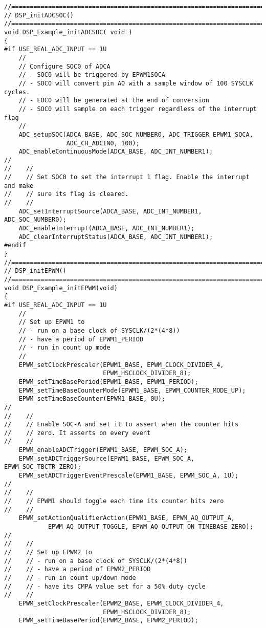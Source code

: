 \begin{lstlisting}[caption=\raggedright{mcu-libs/RLS.h}, frame=single]
//=============================================================================
// DSP_initADCSOC()
//=============================================================================
void DSP_Example_initADCSOC( void )
{
#if USE_REAL_ADC_INPUT == 1U
    //
    // Configure SOC0 of ADCA
    // - SOC0 will be triggered by EPWM1SOCA
    // - SOC0 will convert pin A0 with a sample window of 100 SYSCLK cycles.
    // - EOC0 will be generated at the end of conversion
    // - SOC0 will sample on each trigger regardless of the interrupt flag
    //
    ADC_setupSOC(ADCA_BASE, ADC_SOC_NUMBER0, ADC_TRIGGER_EPWM1_SOCA,
                 ADC_CH_ADCIN0, 100);
    ADC_enableContinuousMode(ADCA_BASE, ADC_INT_NUMBER1);
//
//    //
//    // Set SOC0 to set the interrupt 1 flag. Enable the interrupt and make
//    // sure its flag is cleared.
//    //
    ADC_setInterruptSource(ADCA_BASE, ADC_INT_NUMBER1, ADC_SOC_NUMBER0);
    ADC_enableInterrupt(ADCA_BASE, ADC_INT_NUMBER1);
    ADC_clearInterruptStatus(ADCA_BASE, ADC_INT_NUMBER1);
#endif
}
//=============================================================================
// DSP_initEPWM()
//=============================================================================
void DSP_Example_initEPWM(void)
{
#if USE_REAL_ADC_INPUT == 1U
    //
    // Set up EPWM1 to
    // - run on a base clock of SYSCLK/(2*(4*8))
    // - have a period of EPWM1_PERIOD
    // - run in count up mode
    //
    EPWM_setClockPrescaler(EPWM1_BASE, EPWM_CLOCK_DIVIDER_4,
                           EPWM_HSCLOCK_DIVIDER_8);
    EPWM_setTimeBasePeriod(EPWM1_BASE, EPWM1_PERIOD);
    EPWM_setTimeBaseCounterMode(EPWM1_BASE, EPWM_COUNTER_MODE_UP);
    EPWM_setTimeBaseCounter(EPWM1_BASE, 0U);
//
//    //
//    // Enable SOC-A and set it to assert when the counter hits
//    // zero. It asserts on every event
//    //
    EPWM_enableADCTrigger(EPWM1_BASE, EPWM_SOC_A);
    EPWM_setADCTriggerSource(EPWM1_BASE, EPWM_SOC_A, EPWM_SOC_TBCTR_ZERO);
    EPWM_setADCTriggerEventPrescale(EPWM1_BASE, EPWM_SOC_A, 1U);
//
//    //
//    // EPWM1 should toggle each time its counter hits zero
//    //
    EPWM_setActionQualifierAction(EPWM1_BASE, EPWM_AQ_OUTPUT_A,
            EPWM_AQ_OUTPUT_TOGGLE, EPWM_AQ_OUTPUT_ON_TIMEBASE_ZERO);
//
//    //
//    // Set up EPWM2 to
//    // - run on a base clock of SYSCLK/(2*(4*8))
//    // - have a period of EPWM2_PERIOD
//    // - run in count up/down mode
//    // - have its CMPA value set for a 50% duty cycle
//    //
    EPWM_setClockPrescaler(EPWM2_BASE, EPWM_CLOCK_DIVIDER_4,
                           EPWM_HSCLOCK_DIVIDER_8);
    EPWM_setTimeBasePeriod(EPWM2_BASE, EPWM2_PERIOD);

\end{lstlisting}
